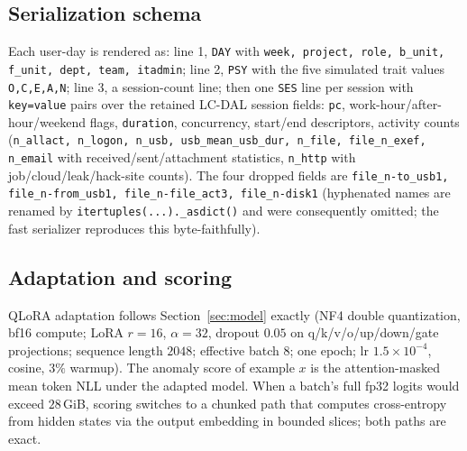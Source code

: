 \documentclass[10pt]{article} %
\begin{document}
\subsection{Serialization schema}
Each user-day is rendered as: line 1, \texttt{DAY} with
\texttt{week, project, role, b\_unit, f\_unit, dept, team, itadmin}; line 2,
\texttt{PSY} with the five simulated trait values \texttt{O,C,E,A,N}; line 3,
a session-count line; then one \texttt{SES} line per session with
\texttt{key=value} pairs over the retained LC-DAL session fields:
\texttt{pc}, work-hour/after-hour/weekend flags, \texttt{duration},
concurrency, start/end descriptors, activity counts
(\texttt{n\_allact, n\_logon, n\_usb, usb\_mean\_usb\_dur, n\_file,
file\_n\_exef, n\_email} with received/sent/attachment statistics,
\texttt{n\_http} with job/cloud/leak/hack-site counts). The four dropped
fields are \texttt{file\_n-to\_usb1, file\_n-from\_usb1, file\_n-file\_act3,
file\_n-disk1} (hyphenated names are renamed by
\texttt{itertuples(...).\_asdict()} and were consequently omitted; the fast
serializer reproduces this byte-faithfully).

\subsection{Adaptation and scoring}
QLoRA adaptation follows Section~\ref{sec:model} exactly (NF4 double
quantization, bf16 compute; LoRA $r{=}16$, $\alpha{=}32$, dropout $0.05$ on
q/k/v/o/up/down/gate projections; sequence length $2048$; effective batch
$8$; one epoch; lr $1.5{\times}10^{-4}$, cosine, $3\%$ warmup). The anomaly
score of example $x$ is the attention-masked mean token NLL under the adapted
model. When a batch's full fp32 logits would exceed $28$\,GiB, scoring
switches to a chunked path that computes cross-entropy from hidden states via
the output embedding in bounded slices; both paths are exact.
\end{document}
